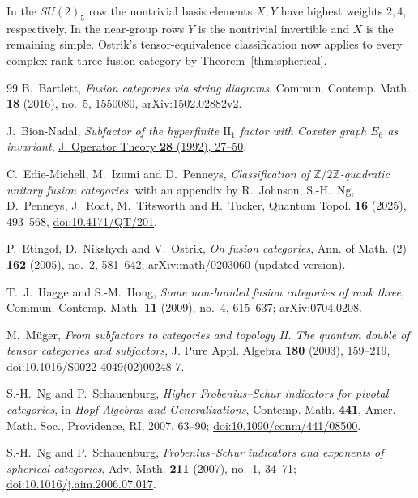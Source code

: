 \documentclass[11pt,a4paper]{article}
\theoremstyle{definition}
\theoremstyle{remark}
\newcommand{\Z}{\mathbb Z}
\numberwithin{equation}{section}
\begin{document}
In the $SU(2)_5$ row the nontrivial basis elements $X,Y$ have highest
weights $2,4$, respectively. In the near-group rows $Y$ is the nontrivial
invertible and $X$ is the remaining simple. Ostrik's tensor-equivalence
classification \cite[Theorem~1.1]{Ostrik} now applies to every complex rank-three fusion category by
Theorem~\ref{thm:spherical}.

\begin{thebibliography}{99}
B.~Bartlett, \emph{Fusion categories via string diagrams}, Commun. Contemp. Math. \textbf{18} (2016), no.~5, 1550080,
\href{https://arxiv.org/abs/1502.02882}{arXiv:1502.02882v2}.

J.~Bion-Nadal,
\emph{Subfactor of the hyperfinite $\mathrm{II}_1$ factor with Coxeter graph $E_6$ as invariant},
\href{https://jot.theta.ro/jot/archive/1992-028-001/1992-028-001-002.html}{J. Operator Theory \textbf{28} (1992), 27--50}.

C.~Edie-Michell, M.~Izumi and D.~Penneys,
\emph{Classification of $\Z/2\Z$-quadratic unitary fusion categories},
with an appendix by R.~Johnson, S.-H.~Ng, D.~Penneys, J.~Roat,
M.~Titsworth and H.~Tucker, Quantum Topol. \textbf{16} (2025), 493--568,
\href{https://doi.org/10.4171/QT/201}{doi:10.4171/QT/201}.

P.~Etingof, D.~Nikshych and V.~Ostrik, \emph{On fusion categories},
Ann. of Math. (2) \textbf{162} (2005), no.~2, 581--642;
\href{https://arxiv.org/abs/math/0203060}{arXiv:math/0203060} (updated version).

T.~J.~Hagge and S.-M.~Hong, \emph{Some non-braided fusion categories of rank three},
Commun. Contemp. Math. \textbf{11} (2009), no.~4, 615--637;
\href{https://arxiv.org/abs/0704.0208}{arXiv:0704.0208}.

M.~Müger, \emph{From subfactors to categories and topology II.
The quantum double of tensor categories and subfactors},
J. Pure Appl. Algebra \textbf{180} (2003), 159--219,
\href{https://doi.org/10.1016/S0022-4049(02)00248-7}{doi:10.1016/S0022-4049(02)00248-7}.

S.-H.~Ng and P.~Schauenburg, \emph{Higher Frobenius--Schur indicators for pivotal categories},
in \emph{Hopf Algebras and Generalizations}, Contemp. Math. \textbf{441},
Amer. Math. Soc., Providence, RI, 2007, 63--90;
\href{https://doi.org/10.1090/conm/441/08500}{doi:10.1090/conm/441/08500}.

S.-H.~Ng and P.~Schauenburg, \emph{Frobenius--Schur indicators and exponents of spherical categories},
Adv. Math. \textbf{211} (2007), no.~1, 34--71;
\href{https://doi.org/10.1016/j.aim.2006.07.017}{doi:10.1016/j.aim.2006.07.017}.


\end{thebibliography}
\end{document}
